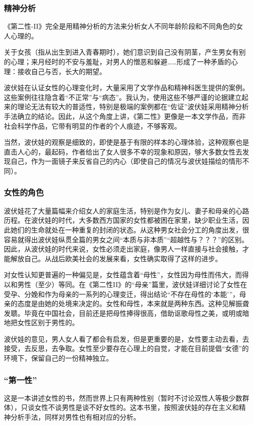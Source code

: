 \subsubsection{精神分析}
《第二性-II》完全是用精神分析的方法来分析女人不同年龄阶段和不同角色的女人心理的。

关于女孩（指从出生到进入青春期时），她们意识到自己没有阴茎，产生男女有别的心理；来月经时的不安与羞耻，对男人的憎恶和躲避……形成了一种矛盾的心理：接收自己与否，长大的期望。

波伏娃在认证女性的心理变化时，大量采用了文学作品和精神科医生提供的案例。这些案例往往隐含着“不正常”与“病态”。我认为，使用这些不够严谨的论据建立起来的理论无法有较大的普适性，特别是极端的案例都在“佐证”波伏娃采用精神分析手法确立的结论。因此，从这个角度上讲，《第二性》更像是一本文学作品，而非社会科学作品，它带有明显的作者的个人痕迹，不够客观。

当然，波伏娃的观察是细致的，即使是基于有限的样本的心理体验，这种观察也是直击人心的，最起码，作者给出了女人很多不幸的现象和原因，够大多数女性去发现自己，作为一面镜子来反省自己的内心（即使自己的情况与波伏娃描绘的情形不同）。

\subsubsection{女性的角色}
波伏娃花了大量篇幅来介绍女人的家庭生活，特别是作为女儿、妻子和母亲的心路历程。在波伏娃的时代，大多数西方国家的女性都被困在家里，缺少职业生活，因此她们的生命就处在一种重复的封闭的状态。从这种男女社会分工的角度出发，很容易就得出波伏娃纵贯全篇的男女之间“本质与非本质”“超越性与？？？”的区别。因此，从波伏娃的时代来说，女性必须走出家庭，像男人一样直接与社会接触，才能解放自己。从战后欧美社会的发展来看，女性确实取得了这样的进步。

对女性认知更普遍的一种偏见是，女性蕴含着“母性”，女性因为母性而伟大，而得以和男性（至少）等同。在《第二性II》的“母亲”篇里，波伏娃详细讨论了女性在受孕、分娩和作为母亲的一系列的心理变迁，得出结论“不存在母性的‘本能’”，母亲的态度是由她的处境来决定的。女性和母性，本来就是两种东西。这种见解振聋发聩。毕竟在中国社会，目前还是把母性捧得很高，借助讴歌母性之美，或明或暗地把女性区别于男性的。

波伏娃的意见，男人女人看了都会有启发，但是更重要的是，女性要主动去看，去接受，去反思，去争取。女性至少要存在心理上的自觉，才能在目前提倡“女德”的环境下，保留自己的一份精神独立。

\subsubsection{“第一性”}
这是一本讲述女性的书，然而世界上只有两种性别（暂时不讨论双性人等极少数群体），只谈女性不谈男性是谈不好女性的。这本书里，按照波伏娃的存在主义和精神分析手法，同样对男性也有相对应的分析。

